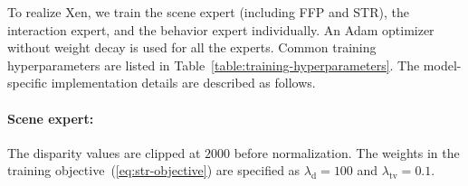 \begin{table}[t]
  \begin{center}
    \caption{On-road anomaly category in DoTA~\citep{yao2022dota}.}
    \label{table:anomaly-category-DoTA}
  \end{center}
\end{table}

To realize Xen, we train the scene expert (including FFP and STR), the interaction expert, and the behavior expert individually. An Adam optimizer~\citep{kingma2014adam} without weight decay is used for all the experts. Common training hyperparameters are listed in Table~\ref{table:training-hyperparameters}. The model-specific implementation details are described as follows.

\paragraph{Scene expert:} The disparity values are clipped at $2000$ before normalization. The weights in the training objective~(\ref{eq:str-objective}) are specified as $\lambda_\text{d}=100$ and $\lambda_\text{tv}=0.1$.


